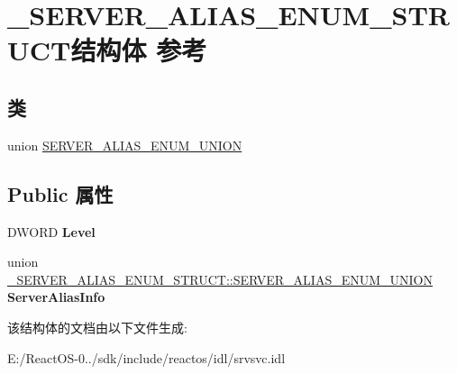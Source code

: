 \hypertarget{struct___s_e_r_v_e_r___a_l_i_a_s___e_n_u_m___s_t_r_u_c_t}{}\section{\+\_\+\+S\+E\+R\+V\+E\+R\+\_\+\+A\+L\+I\+A\+S\+\_\+\+E\+N\+U\+M\+\_\+\+S\+T\+R\+U\+C\+T结构体 参考}
\label{struct___s_e_r_v_e_r___a_l_i_a_s___e_n_u_m___s_t_r_u_c_t}
\subsection*{类}
\begin{DoxyCompactItemize}
\item 
union \hyperlink{union___s_e_r_v_e_r___a_l_i_a_s___e_n_u_m___s_t_r_u_c_t_1_1_s_e_r_v_e_r___a_l_i_a_s___e_n_u_m___u_n_i_o_n}{S\+E\+R\+V\+E\+R\+\_\+\+A\+L\+I\+A\+S\+\_\+\+E\+N\+U\+M\+\_\+\+U\+N\+I\+ON}
\end{DoxyCompactItemize}
\subsection*{Public 属性}
\begin{DoxyCompactItemize}
\item 
\mbox{\label{struct___s_e_r_v_e_r___a_l_i_a_s___e_n_u_m___s_t_r_u_c_t_ace33bb30bef5badf22fb6aced7863d26}} 
D\+W\+O\+RD {\bfseries Level}
\item 
\mbox{\label{struct___s_e_r_v_e_r___a_l_i_a_s___e_n_u_m___s_t_r_u_c_t_a0f013b595d09ecc493b6c52ec540a1fc}} 
union \hyperlink{union___s_e_r_v_e_r___a_l_i_a_s___e_n_u_m___s_t_r_u_c_t_1_1_s_e_r_v_e_r___a_l_i_a_s___e_n_u_m___u_n_i_o_n}{\+\_\+\+S\+E\+R\+V\+E\+R\+\_\+\+A\+L\+I\+A\+S\+\_\+\+E\+N\+U\+M\+\_\+\+S\+T\+R\+U\+C\+T\+::\+S\+E\+R\+V\+E\+R\+\_\+\+A\+L\+I\+A\+S\+\_\+\+E\+N\+U\+M\+\_\+\+U\+N\+I\+ON} {\bfseries Server\+Alias\+Info}
\end{DoxyCompactItemize}


该结构体的文档由以下文件生成\+:\begin{DoxyCompactItemize}
\item 
E\+:/\+React\+O\+S-\/0../sdk/include/reactos/idl/srvsvc.\+idl\end{DoxyCompactItemize}
